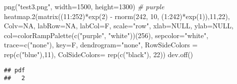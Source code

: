 \documentclass[
]{article}
\newenvironment{Shaded}{\begin{snugshade}}{\end{snugshade}}
\newcommand{\AttributeTok}[1]{\textcolor[rgb]{0.77,0.63,0.00}{#1}}
\newcommand{\CommentTok}[1]{\textcolor[rgb]{0.56,0.35,0.01}{\textit{#1}}}
\newcommand{\ConstantTok}[1]{\textcolor[rgb]{0.00,0.00,0.00}{#1}}
\newcommand{\DecValTok}[1]{\textcolor[rgb]{0.00,0.00,0.81}{#1}}
\newcommand{\FunctionTok}[1]{\textcolor[rgb]{0.00,0.00,0.00}{#1}}
\newcommand{\NormalTok}[1]{#1}
\newcommand{\SpecialCharTok}[1]{\textcolor[rgb]{0.00,0.00,0.00}{#1}}
\newcommand{\StringTok}[1]{\textcolor[rgb]{0.31,0.60,0.02}{#1}}
\begin{document}
\begin{Shaded}
\begin{Highlighting}[]
\FunctionTok{png}\NormalTok{(}\StringTok{"test3.png"}\NormalTok{, }\AttributeTok{width=}\DecValTok{1500}\NormalTok{, }\AttributeTok{height=}\DecValTok{1300}\NormalTok{)  }\CommentTok{\# purple}
\FunctionTok{heatmap.2}\NormalTok{(}\FunctionTok{matrix}\NormalTok{((}\DecValTok{11}\SpecialCharTok{:}\DecValTok{252}\NormalTok{)}\SpecialCharTok{*}\FunctionTok{exp}\NormalTok{(}\DecValTok{2}\NormalTok{) }\SpecialCharTok{{-}}  \FunctionTok{rnorm}\NormalTok{(}\DecValTok{242}\NormalTok{, }\DecValTok{10}\NormalTok{, (}\DecValTok{1}\SpecialCharTok{:}\DecValTok{242}\NormalTok{)}\SpecialCharTok{*}\FunctionTok{exp}\NormalTok{(}\DecValTok{1}\NormalTok{)),}\DecValTok{11}\NormalTok{,}\DecValTok{22}\NormalTok{),}
          \AttributeTok{Colv=}\ConstantTok{NA}\NormalTok{, }\AttributeTok{labRow=}\ConstantTok{NA}\NormalTok{, }\AttributeTok{labCol=}\NormalTok{F, }\AttributeTok{scale=}\StringTok{"row"}\NormalTok{, }\AttributeTok{xlab=}\ConstantTok{NULL}\NormalTok{, }\AttributeTok{ylab=}\ConstantTok{NULL}\NormalTok{,}
          \AttributeTok{col=}\FunctionTok{colorRampPalette}\NormalTok{(}\FunctionTok{c}\NormalTok{(}\StringTok{"purple"}\NormalTok{, }\StringTok{"white"}\NormalTok{))(}\DecValTok{256}\NormalTok{), }
        \AttributeTok{sepcolor=}\StringTok{"white"}\NormalTok{, }\AttributeTok{trace=}\FunctionTok{c}\NormalTok{(}\StringTok{"none"}\NormalTok{), }\AttributeTok{key=}\NormalTok{F, }\AttributeTok{dendrogram=}\StringTok{"none"}\NormalTok{,}
        \AttributeTok{RowSideColors =} \FunctionTok{rep}\NormalTok{(}\FunctionTok{c}\NormalTok{(}\StringTok{"blue"}\NormalTok{),}\DecValTok{11}\NormalTok{), }\AttributeTok{ColSideColors=}  \FunctionTok{rep}\NormalTok{(}\FunctionTok{c}\NormalTok{(}\StringTok{"black"}\NormalTok{), }\DecValTok{22}\NormalTok{))}
\FunctionTok{dev.off}\NormalTok{()}
\end{Highlighting}
\end{Shaded}

\begin{verbatim}
## pdf 
##   2
\end{verbatim}
\end{document}
